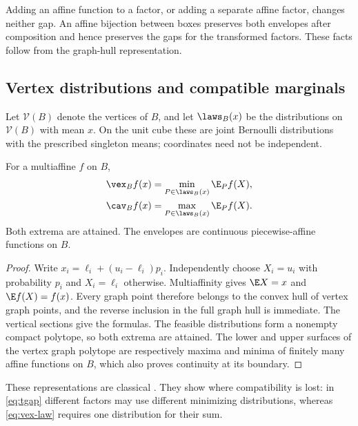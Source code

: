 Adding an affine function to a factor, or adding a separate affine factor,
changes neither gap. An affine bijection between boxes preserves both
envelopes after composition and hence preserves the gaps for the transformed
factors. These facts follow from the graph-hull representation.

\subsection{Vertex distributions and compatible marginals}
Let $\mathcal V(B)$ denote the vertices of $B$, and let $\laws_B(x)$ be
the distributions on $\mathcal V(B)$ with mean $x$. On the unit cube these
are joint Bernoulli distributions with the prescribed singleton means;
coordinates need not be independent.

\begin{lemma}\label{lem:vertex-law}
For a multiaffine $f$ on $B$,
\begin{align}
 \vex_B f(x)&=\min_{P\in\laws_B(x)}\E_P f(X),\label{eq:vex-law}\\
 \cav_B f(x)&=\max_{P\in\laws_B(x)}\E_P f(X).\label{eq:cav-law}
\end{align}
Both extrema are attained. The envelopes are continuous piecewise-affine
functions on $B$.
\end{lemma}
\begin{proof}
Write $x_i=\ell_i+(u_i-\ell_i)p_i$. Independently choose $X_i=u_i$ with
probability $p_i$ and $X_i=\ell_i$ otherwise. Multiaffinity gives
$\E X=x$ and $\E f(X)=f(x)$. Every graph point therefore belongs to the
convex hull of vertex graph points, and the reverse inclusion in the full
graph hull is immediate. The vertical sections give the formulas. The
feasible distributions form a nonempty compact polytope, so both extrema
are attained. The lower and upper surfaces of the vertex graph polytope
are respectively maxima and minima of finitely many affine functions on
$B$, which also proves continuity at its boundary.
\end{proof}

These representations are classical \citep[Section 3]{Luedtke2012}. They
show where compatibility is lost: in \eqref{eq:tgap} different factors may
use different minimizing distributions, whereas \eqref{eq:vex-law} requires
one distribution for their sum.

